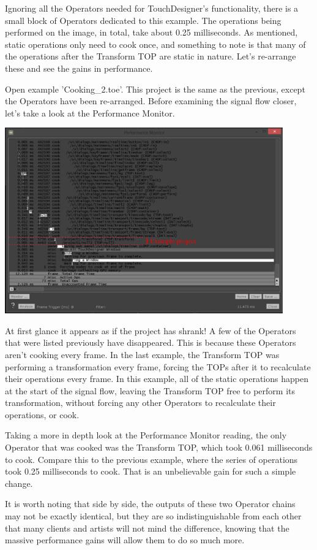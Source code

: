 \begin{fullwidth}
Ignoring all the Operators needed for TouchDesigner's functionality, there is a small block of Operators dedicated to this example. The operations being performed on the image, in total, take about 0.25 milliseconds. As mentioned, static operations only need to cook once, and something to note is that many of the operations after the Transform TOP are  static in nature. Let's re-arrange these and see the gains in performance.

Open example 'Cooking\_2.toe'. This project is the same as the previous, except the Operators have been re-arranged. Before examining the signal flow closer, let's take a look at the Performance Monitor.

\begin{center}
\includegraphics[width=12cm]{./img/11.4/operator-cooking-2.png}
\end{center}

At first glance it appears as if the project has shrank! A few of the Operators that were listed previously have disappeared. This is because these Operators aren't cooking every frame. In the last example, the Transform TOP was performing a transformation every frame, forcing the TOPs after it to recalculate their operations every frame. In this example, all of the static operations happen at the start of the signal flow, leaving the Transform TOP free to perform its transformation, without forcing any other Operators to recalculate their operations, or cook.

Taking a more in depth look at the Performance Monitor reading, the only Operator that was cooked was the Transform TOP, which took 0.061 milliseconds to cook. Compare this to the previous example, where the series of operations took 0.25 milliseconds to cook. That is an unbelievable gain for such a simple change.

It is worth noting that side by side, the outputs of these two Operator chains may not be exactly identical, but they are so indistinguishable from each other that many clients and artists will not mind the difference, knowing that the massive performance gains will allow them to do so much more.

\end{fullwidth}

